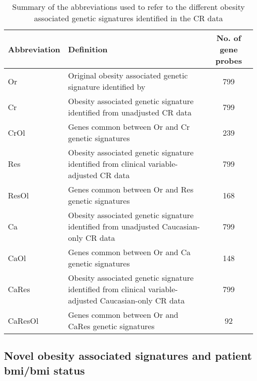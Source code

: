 \begin{table}[tb]
	\centering
	\caption{Summary of the abbreviations used to refer to the different obesity associated genetic signatures identified in the CR data}
	\label{tab:mg_abbrev}
	\begin{tabular}{lp{}c}
		\hline
		\hline
		Abbreviation & Definition & No. of gene probes\\
		\hline
		\rule{0pt}{2.25ex}Or      & Original obesity associated genetic signature identified by \citet{Creighton2012}                       & 799\\
		\rule{0pt}{2.25ex}Cr      & Obesity associated genetic signature identified from unadjusted CR data                                & 799 \\
		\rule{0pt}{2.25ex}CrOl    & Genes common between Or and Cr genetic signatures                                                       & 239\\
		\rule{0pt}{2.25ex}Res     & Obesity associated genetic signature identified from clinical variable-adjusted CR data                & 799\\
		\rule{0pt}{2.25ex}ResOl   & Genes common between Or and Res genetic signatures                                                      & 168\\
		\rule{0pt}{2.25ex}Ca      & Obesity associated genetic signature identified from unadjusted Caucasian-only CR data                 & 799\\
		\rule{0pt}{2.25ex}CaOl    & Genes common between Or and Ca genetic signatures                                                       & 148\\
		\rule{0pt}{2.25ex}CaRes   & Obesity associated genetic signature identified from clinical variable-adjusted Caucasian-only CR data & 799\\
		\rule{0pt}{2.25ex}CaResOl & Genes common between Or and CaRes genetic signatures                                                    & 92\\
		\hline
		\hline
	\end{tabular}
\end{table}

\subsection{Novel obesity associated signatures and patient \gls{bmi}/\gls{bmi} status}
\label{sub:_novel_obesity_associated_signatures_and_sample_bmi}

